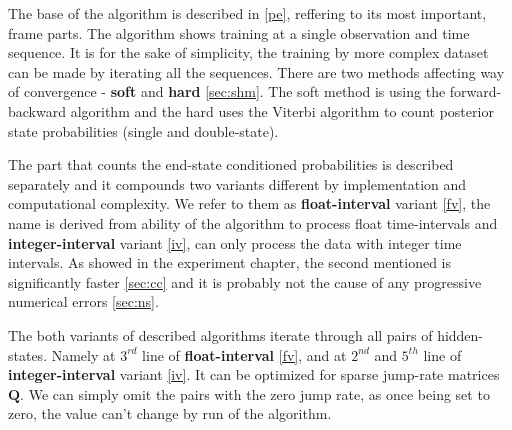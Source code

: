 \documentclass[thesis=M,english]{FITthesis}[2012/10/20]
\newcommand{\matr}[1]{\mathbf{#1}}
\begin{document}
The base of the algorithm is described in \ref{pe}, reffering to its most important, frame parts.  The algorithm shows training at a single observation and time sequence. It is for the sake of simplicity, the training by more complex dataset can be made by iterating all the sequences. There are two methods affecting way of convergence - \textbf{soft} and \textbf{hard} \ref{sec:shm}. The soft method is using the forward-backward algorithm and the hard uses the Viterbi algorithm to count posterior state probabilities (single and double-state).

The part that counts the end-state conditioned probabilities is described separately and it compounds two variants different by implementation and computational complexity. We refer to them as \textbf{float-interval} variant \ref{fv}, the name is derived from ability of the algorithm to process float time-intervals and \textbf{integer-interval} variant \ref{iv}, can only process the data with integer time intervals. As showed in the experiment chapter, the second mentioned is significantly faster \ref{sec:cc} and it is probably not the cause of any progressive numerical errors \ref{sec:ns}.

The both variants of described algorithms iterate through all pairs of hidden-states. Namely at $3^{rd}$ line of \textbf{float-interval} \ref{fv}, and at $2^{nd}$ and $5^{th}$ line of \textbf{integer-interval} variant \ref{iv}. It can be optimized for sparse jump-rate matrices $\matr{Q}$. We can simply omit the pairs with the zero jump rate, as once being set to zero, the value can't change by run of the algorithm.       
\end{document}
